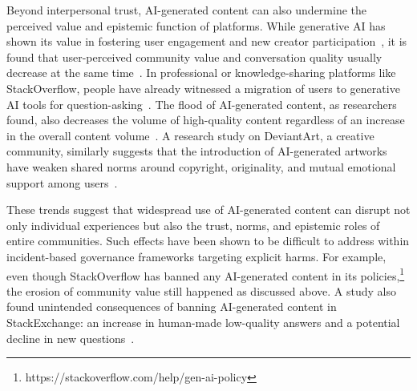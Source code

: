 Beyond interpersonal trust, AI-generated content can also undermine the perceived value and epistemic function of platforms. While generative AI has shown its value in fostering user engagement and new creator participation~\cite{moller2025impact, matatov2024examining, wei2024exploring}, it is found that user-perceived community value and conversation quality usually decrease at the same time~\cite{moller2025impact, eissa2025influence, lloyd2025there}. In professional or knowledge-sharing platforms like StackOverflow, people have already witnessed a migration of users to generative AI tools for question-asking~\cite{zhou2024examining, burtch2023consequences, kabir2024stack}. The flood of AI-generated content, as researchers found, also decreases the volume of high-quality content regardless of an increase in the overall content volume~\cite{li2025impacts, burtch2023consequences}. A research study on DeviantArt, a creative community, similarly suggests that the introduction of AI-generated artworks have weaken shared norms around copyright, originality, and mutual emotional support among users~\cite{guo2025exploring}. 

These trends suggest that widespread use of AI-generated content can disrupt not only individual experiences but also the trust, norms, and epistemic roles of entire communities. Such effects have been shown to be difficult to address within incident-based governance frameworks targeting explicit harms. For example, even though StackOverflow has banned any AI-generated content in its policies,\footnote{https://stackoverflow.com/help/gen-ai-policy} the erosion of community value still happened as discussed above. A study also found unintended consequences of banning AI-generated content in StackExchange: an increase in human-made low-quality answers and a potential decline in new questions~\cite{wang2024can}. %



